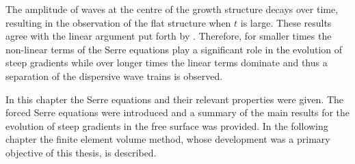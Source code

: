 The amplitude of waves at the centre of the growth structure decays over time, resulting in the observation of the flat structure when $t$ is large. These results agree with the linear argument put forth by \citet{Dougalis-etal-2007}. Therefore, for smaller times the non-linear terms of the Serre equations play a significant role in the evolution of steep gradients while over longer times the linear terms dominate and thus a separation of the dispersive wave trains is observed. 

\medskip

In this chapter the Serre equations and their relevant properties were given. The forced Serre equations were introduced and a summary of the main results for the evolution of steep gradients in the free surface was provided. In the following chapter the finite element volume method, whose development was a primary objective of this thesis, is described. 
